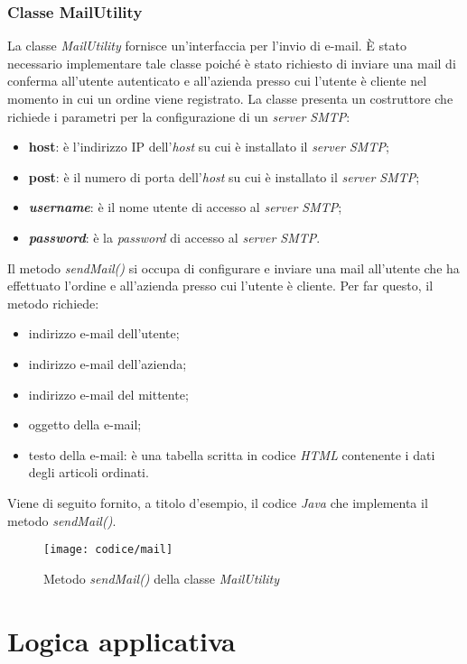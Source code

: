 \subsubsection{Classe MailUtility}

La classe \textit{MailUtility} fornisce un'interfaccia per l'invio di e-mail. È stato necessario implementare tale classe poiché è stato richiesto di inviare una mail di conferma all'utente autenticato e all'azienda presso cui l'utente è cliente nel momento in cui un ordine viene registrato. La classe presenta un costruttore che richiede i parametri per la configurazione di un \textit{server SMTP}:
\begin{itemize}
	\item \textbf{host}: è l'indirizzo IP dell'\textit{host} su cui è installato il \textit{server SMTP};
	\item \textbf{post}: è il numero di porta dell'\textit{host} su cui è installato il \textit{server SMTP};
	\item \textbf{\textit{username}}: è il nome utente di accesso al \textit{server SMTP};
	\item \textbf{\textit{password}}: è la \textit{password} di accesso al \textit{server SMTP}.
\end{itemize}
Il metodo \textit{sendMail()} si occupa di configurare e inviare una mail all'utente che ha effettuato l'ordine e all'azienda presso cui l'utente è cliente. Per far questo, il metodo richiede:
\begin{itemize}
	\item indirizzo e-mail dell'utente;
	\item indirizzo e-mail dell'azienda;
	\item indirizzo e-mail del mittente;
	\item oggetto della e-mail;
	\item testo della e-mail: è una tabella scritta in codice \textit{HTML} contenente i dati degli articoli ordinati.
\end{itemize}
Viene di seguito fornito, a titolo d'esempio, il codice \textit{Java} che implementa il metodo \textit{sendMail()}.

\newpage

\begin{figure}[!h] 
    \centering 
    \texttt{[image: codice/mail]} 
    \caption{Metodo \textit{sendMail()} della classe \textit{MailUtility}}
\end{figure}

\section{Logica applicativa}

